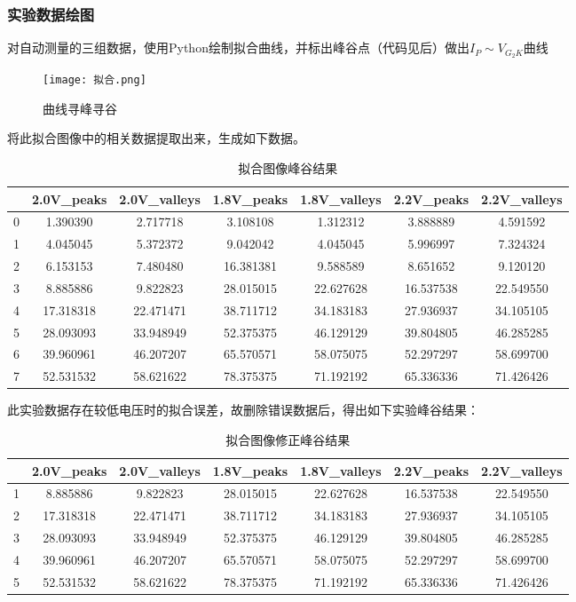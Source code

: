 \documentclass[dvipsnames, svgnames,a4paper,11pt]{article}
\begin{document}
	\subsubsection{实验数据绘图}
	
	对自动测量的三组数据，使用Python绘制拟合曲线，并标出峰谷点（代码见后）做出$I_P{\sim}V_{G_2K}$曲线
	\begin{figure}[{H}]
		\centering
		\texttt{[image: 拟合.png]}
		\caption{曲线寻峰寻谷}
		\label{}
	\end{figure}
将此拟合图像中的相关数据提取出来，生成如下数据。
	\begin{table}[H]
		\centering\caption{拟合图像峰谷结果}
		\begin{tabular}{lcccccc}
		\hline
		 & 2.0V\_peaks & 2.0V\_valleys & 1.8V\_peaks & 1.8V\_valleys & 2.2V\_peaks & 2.2V\_valleys \\
		\hline
		0 & 1.390390 & 2.717718 & 3.108108 & 1.312312 & 3.888889 & 4.591592 \\
		1 & 4.045045 & 5.372372 & 9.042042 & 4.045045 & 5.996997 & 7.324324 \\
		2 & 6.153153 & 7.480480 & 16.381381 & 9.588589 & 8.651652 & 9.120120 \\
		3 & 8.885886 & 9.822823 & 28.015015 & 22.627628 & 16.537538 & 22.549550 \\
		4 & 17.318318 & 22.471471 & 38.711712 & 34.183183 & 27.936937 & 34.105105 \\
		5 & 28.093093 & 33.948949 & 52.375375 & 46.129129 & 39.804805 & 46.285285 \\
		6 & 39.960961 & 46.207207 & 65.570571 & 58.075075 & 52.297297 & 58.699700 \\
		7 & 52.531532 & 58.621622 & 78.375375 & 71.192192 & 65.336336 & 71.426426 \\
		\hline
		\end{tabular}
		
		\label{tab:example}
		\end{table}
		此实验数据存在较低电压时的拟合误差，故删除错误数据后，得出如下实验峰谷结果：
		\begin{table}[H]
			\centering\caption{拟合图像修正峰谷结果}
			\begin{tabular}{lcccccc}
			\hline
			 & 2.0V\_peaks & 2.0V\_valleys & 1.8V\_peaks & 1.8V\_valleys & 2.2V\_peaks & 2.2V\_valleys \\
			\hline
			1& 8.885886 & 9.822823 & 28.015015 & 22.627628 & 16.537538 & 22.549550 \\
			2 & 17.318318 & 22.471471 & 38.711712 & 34.183183 & 27.936937 & 34.105105 \\
			3 & 28.093093 & 33.948949 & 52.375375 & 46.129129 & 39.804805 & 46.285285 \\
			4 & 39.960961 & 46.207207 & 65.570571 & 58.075075 & 52.297297 & 58.699700 \\
			5 & 52.531532 & 58.621622 & 78.375375 & 71.192192 & 65.336336 & 71.426426 \\
			\hline
			\end{tabular}
			
			\label{tab:example}
			\end{table}
\end{document}
